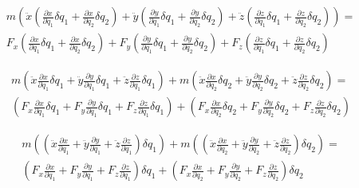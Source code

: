 \begin{equation*}
\begin{split}
    m\left(
        \ddot{x}\left(
            \frac{\partial x}{\partial q_1}\delta q_1+
            \frac{\partial x}{\partial q_2}\delta q_2
        \right)+
        \ddot{y}\left(
            \frac{\partial y}{\partial q_1}\delta q_1+
            \frac{\partial y}{\partial q_2}\delta q_2
        \right)+
        \ddot{z}\left(
            \frac{\partial z}{\partial q_1}\delta q_1+
            \frac{\partial z}{\partial q_2}\delta q_2
        \right)
    \right)=\\
    F_x\left(
        \frac{\partial x}{\partial q_1}\delta q_1+
        \frac{\partial x}{\partial q_2}\delta q_2
    \right)+
    F_y\left(
        \frac{\partial y}{\partial q_1}\delta q_1+
        \frac{\partial y}{\partial q_2}\delta q_2
    \right)+
    F_z\left(
        \frac{\partial z}{\partial q_1}\delta q_1+
        \frac{\partial z}{\partial q_2}\delta q_2
    \right)
\end{split}
\end{equation*}

\begin{equation*}
\begin{split}
    m\left(
        \ddot{x}\frac{\partial x}{\partial q_1}\delta q_1+
        \ddot{y}\frac{\partial y}{\partial q_1}\delta q_1+
        \ddot{z}\frac{\partial z}{\partial q_1}\delta q_1
    \right)+
    m\left(
        \ddot{x}\frac{\partial x}{\partial q_2}\delta q_2+
        \ddot{y}\frac{\partial y}{\partial q_2}\delta q_2+
        \ddot{z}\frac{\partial z}{\partial q_2}\delta q_2
    \right)=\\
    \left(
        F_x\frac{\partial x}{\partial q_1}\delta q_1+
        F_y\frac{\partial y}{\partial q_1}\delta q_1+
        F_z\frac{\partial z}{\partial q_1}\delta q_1
    \right)+
    \left(
        F_x\frac{\partial x}{\partial q_2}\delta q_2+
        F_y\frac{\partial y}{\partial q_2}\delta q_2+
        F_z\frac{\partial z}{\partial q_2}\delta q_2
    \right)
\end{split}
\end{equation*}

\begin{equation*}
\begin{split}
    m\left(
        \left(
            \ddot{x}\frac{\partial x}{\partial q_1}+
            \ddot{y}\frac{\partial y}{\partial q_1}+
            \ddot{z}\frac{\partial z}{\partial q_1}
        \right)\delta q_1
    \right)+
    m\left(
        \left(
            \ddot{x}\frac{\partial x}{\partial q_2}+
            \ddot{y}\frac{\partial y}{\partial q_2}+
            \ddot{z}\frac{\partial z}{\partial q_2}
        \right)\delta q_2
    \right)=\\
    \left(
        F_x\frac{\partial x}{\partial q_1}+
        F_y\frac{\partial y}{\partial q_1}+
        F_z\frac{\partial z}{\partial q_1}
    \right)\delta q_1+
    \left(
        F_x\frac{\partial x}{\partial q_2}+
        F_y\frac{\partial y}{\partial q_2}+
        F_z\frac{\partial z}{\partial q_2}
    \right)\delta q_2
\end{split}
\end{equation*}

